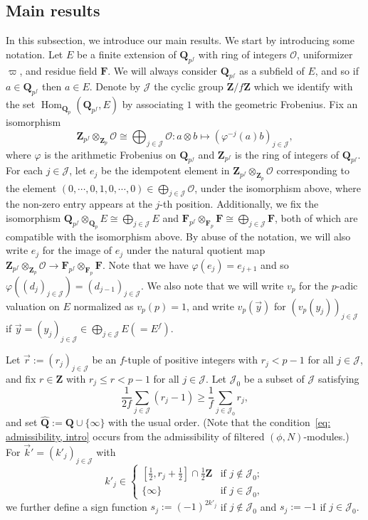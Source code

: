 \documentclass[11pt]{amsart}
\theoremstyle{definition}
\numberwithin{equation}{subsection}
\theoremstyle{plain}
\theoremstyle{plain}
\theoremstyle{plain}
\theoremstyle{plain}
\theoremstyle{plain}
\theoremstyle{plain}
\theoremstyle{plain}
\theoremstyle{plain}
\theoremstyle{plain}
\theoremstyle{plain}
\theoremstyle{plain}
\theoremstyle{plain}
\theoremstyle{definition}
\theoremstyle{definition}
\theoremstyle{definition}
\theoremstyle{remark}
\renewcommand{\(}{\textup{(}}
\renewcommand{\)}{\textup{)}}
\DeclareMathOperator{\Hom}{Hom}
\newcommand{\Q}{\mathbf{Q}}
\newcommand{\Z}{\mathbf{Z}}
\newcommand{\F}{\mathbf{F}}
\newcommand{\cO}{\mathcal{O}}
\newcommand{\cJ}{\mathcal{J}}
\newcommand{\vr}{\vec{r}}
\newcommand{\vk}{\vec{k}}
\begin{document}
\subsection{Main results}\label{subsec: main results, intro}
In this subsection, we introduce our main results. We start by introducing some notation. Let $E$ be a finite extension of $\Q_{p^f}$ with ring of integers $\cO$, uniformizer $\varpi$, and residue field $\F$. We will always consider $\Q_{p^f}$ as a subfield of $E$, and so if $a\in\Q_{p^f}$ then $a\in E$. Denote by $\cJ$ the cyclic group $\Z/f\Z$ which we identify with the set $\Hom_{\Q_p}(\Q_{p^f},E)$ by associating $1$ with the geometric Frobenius. Fix an isomorphism $$\Z_{p^f}\otimes_{\Z_p}\cO\cong \bigoplus_{j\in\cJ}\cO: a\otimes b\mapsto (\varphi^{-j}(a)b)_{j\in\cJ},$$ where $\varphi$ is the arithmetic Frobenius on $\Q_{p^f}$ and $\Z_{p^f}$ is the ring of integers of $\Q_{p^f}$. For each $j\in\cJ$, let $e_j$ be the idempotent element in $\Z_{p^f}\otimes_{\Z_p}\cO$ corresponding to the element $(0,\cdots,0,1,0,\cdots,0)\in \bigoplus_{j\in\cJ}\cO$, under the isomorphism above, where the non-zero entry appears at the $j$-th position. Additionally, we fix the isomorphism $\Q_{p^f}\otimes_{\Q_p} E\cong \bigoplus_{j\in\cJ}E$ and $\F_{p^f}\otimes_{\F_p}\F\cong \bigoplus_{j\in\cJ}\F$, both of which are compatible with the isomorphism above. By abuse of the notation, we will also write $e_j$ for the image of $e_j$ under the natural quotient map $\Z_{p^f}\otimes_{\Z_p}\cO\rightarrow \F_{p^f}\otimes_{\F_p}\F$. Note that we have $\varphi(e_j)=e_{j+1}$ and so $\varphi((d_j)_{j\in\cJ})=(d_{j-1})_{j\in\cJ}$. We also note that we will write $v_p$ for the $p$-adic valuation on $E$ normalized as $v_p(p)=1$, and write $v_p(\vec{y})$ for $(v_p(y_j))_{j\in\cJ}$ if $\vec{y}=(y_j)_{j\in\cJ}\in \bigoplus_{j\in\cJ}E(=E^f)$.


Let $\vr:=(r_j)_{j\in\cJ}$ be an $f$-tuple of positive integers with $r_j<p-1$ for all $j\in\cJ$, and fix $r\in\Z$ with $r_j\leq r<p-1$ for all $j\in\cJ$. Let $\cJ_0$ be a subset of $\cJ$ satisfying
\begin{equation}\label{eq: admissibility, intro}
\frac{1}{2f}\sum_{j\in\cJ}(r_j-1)\geq\frac{1}{f}\sum_{j\in \cJ_0}r_j,
\end{equation}
and set $\hat{\Q}:=\Q\cup\{\infty\}$ with the usual order. (Note that the condition~\eqref{eq: admissibility, intro} occurs from the admissibility of filtered $(\phi,N)$-modules.) For $\vk'=(k'_j)_{j\in\cJ}$ with 
\begin{equation}\label{eq: condition for k', intro}
k'_j\in
\begin{cases}
   [\frac{1}{2},r_j+\frac{1}{2}]\cap\frac{1}{2}\Z & \mbox{if } j\not\in\cJ_0; \\
   \{\infty\} & \mbox{if } j\in\cJ_0,
\end{cases}
\end{equation}
we further define a sign function $s_j:=(-1)^{2k'_j}$ if $j\not\in \cJ_0$ and $s_j:=-1$ if $j\in\cJ_0$.
\end{document}
